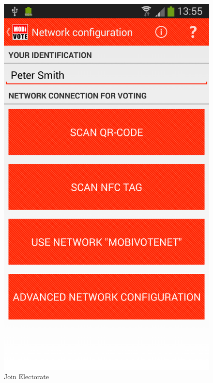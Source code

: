 \documentclass[numbers=noenddot, abstract=on, a4paper, headsepline,
footsepline, oneside, draft=off]{scrreprt}
\begin{document}
\begin{figure}[!htb]
	\begin{minipage}{.5\textwidth}
  		\centering
		\includegraphics[height=.4\textheight]{img/screenshots/join_electorate}
		\caption{Join Electorate}
		\label{fig:handbook_joinelectorate}
	\end{minipage}
	\begin{minipage}{.5\textwidth}
  		\centering

\end{minipage}
\end{figure}
\end{document}
